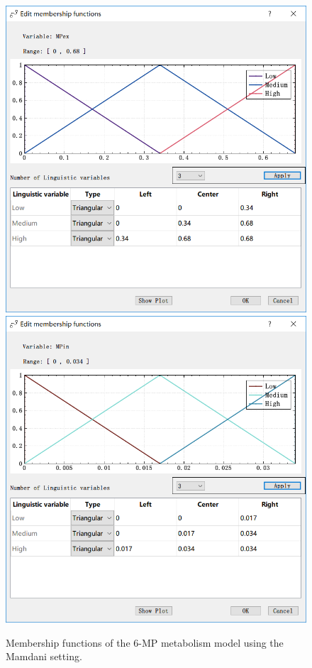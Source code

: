 \documentclass[journal,a4paper,onecolumn]{article}
\begin{document}
\begin{figure}[!hbt]
	\begin{center}
		\includegraphics[width=0.45\columnwidth]{fig57}
		\includegraphics[width=0.45\columnwidth]{fig58}
		\caption{Membership functions of the 6-MP metabolism model using the Mamdani setting.}
		\label{fig:Membership functions of 6-MP metabolism using Mamdani.}
	\end{center}
\end{figure}
\end{document}
